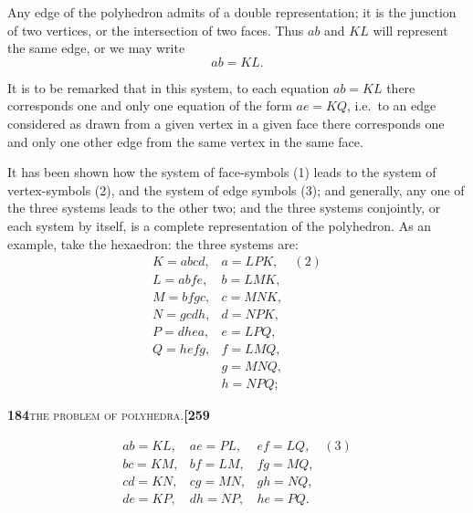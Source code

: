 \documentclass[11pt]{article}
\begin{document}
Any edge of the polyhedron admits of a double representation; it is the junction of two vertices, or the intersection of two faces. Thus $ab$ and $KL$ will represent the same edge, or we may write
\[
ab = KL. \tag{3}
\]

It is to be remarked that in this system, to each equation $ab = KL$ there corresponds one and only one equation of the form $ae = KQ$, i.e.\ to an edge considered as drawn from a given vertex in a given face there corresponds one and only one other edge from the same vertex in the same face.

It has been shown how the system of face-symbols (1) leads to the system of vertex-symbols (2), and the system of edge symbols (3); and generally, any one of the three systems leads to the other two; and the three systems conjointly, or each system by itself, is a complete representation of the polyhedron. As an example, take the hexaedron: the three systems are:
\[
\begin{array}{lll}
K = abcd, & a = LPK, & (2)\\
L = abfe, & b = LMK, & \\
M = bfgc, & c = MNK, & \\
N = gcdh, & d = NPK, & \\
P = dhea, & e = LPQ, & \\
Q = hefg, & f = LMQ, & \\
& g = MNQ, & \\
& h = NPQ; &
\end{array}
\]

\newpage

\noindent\textbf{184}\hfill\textsc{the problem of polyhedra.}\hfill\textbf{[259}

\medskip

\[
\begin{array}{lll}
ab = KL, & ae = PL, & ef = LQ, \quad (3)\\
bc = KM, & bf = LM, & fg = MQ, \\
cd = KN, & cg = MN, & gh = NQ, \\
de = KP, & dh = NP, & he = PQ.
\end{array}
\]

\medskip
\end{document}
